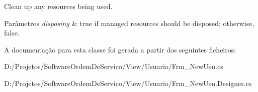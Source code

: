 Clean up any resources being used. 


\begin{DoxyParams}{Parâmetros}
{\em disposing} & true if managed resources should be disposed; otherwise, false.\\
\hline
\end{DoxyParams}


A documentação para esta classe foi gerada a partir dos seguintes ficheiros\+:\begin{DoxyCompactItemize}
\item 
D\+:/\+Projetos/\+Software\+Ordem\+De\+Servico/\+View/\+Usuario/Frm\+\_\+\+New\+Usu.\+cs\item 
D\+:/\+Projetos/\+Software\+Ordem\+De\+Servico/\+View/\+Usuario/Frm\+\_\+\+New\+Usu.\+Designer.\+cs\end{DoxyCompactItemize}
